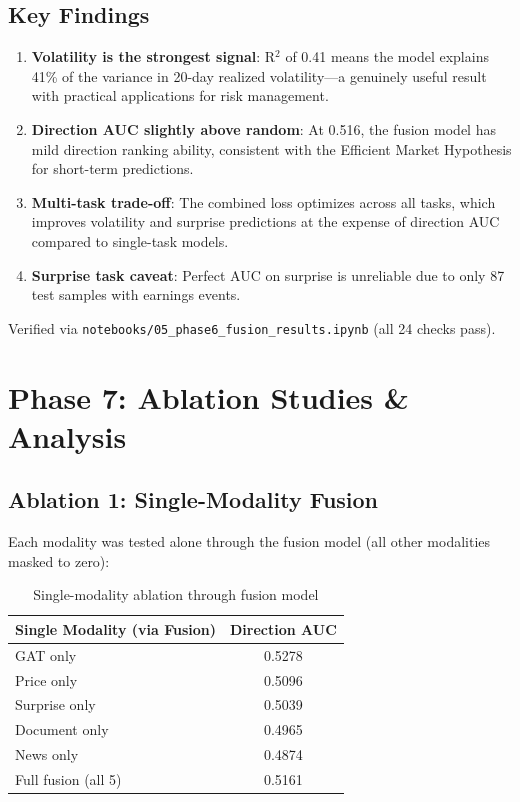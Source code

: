 \documentclass[12pt,a4paper]{article}
\begin{document}
\subsection{Key Findings}

\begin{enumerate}
    \item \textbf{Volatility is the strongest signal}: R$^2$ of 0.41 means the model explains 41\% of the variance in 20-day realized volatility---a genuinely useful result with practical applications for risk management.
    
    \item \textbf{Direction AUC slightly above random}: At 0.516, the fusion model has mild direction ranking ability, consistent with the Efficient Market Hypothesis for short-term predictions.
    
    \item \textbf{Multi-task trade-off}: The combined loss optimizes across all tasks, which improves volatility and surprise predictions at the expense of direction AUC compared to single-task models.
    
    \item \textbf{Surprise task caveat}: Perfect AUC on surprise is unreliable due to only 87 test samples with earnings events.
\end{enumerate}

\noindent Verified via \texttt{notebooks/05\_phase6\_fusion\_results.ipynb} (all 24 checks pass).

\section{Phase 7: Ablation Studies \& Analysis}
\label{sec:phase7}

\subsection{Ablation 1: Single-Modality Fusion}

Each modality was tested alone through the fusion model (all other modalities masked to zero):

\begin{table}[H]
\centering
\begin{tabular}{lc}
\toprule
\textbf{Single Modality (via Fusion)} & \textbf{Direction AUC} \\
\midrule
GAT only & 0.5278 \\
Price only & 0.5096 \\
Surprise only & 0.5039 \\
Document only & 0.4965 \\
News only & 0.4874 \\
\midrule
Full fusion (all 5) & 0.5161 \\
\bottomrule
\end{tabular}
\caption{Single-modality ablation through fusion model}
\label{tab:single_mod}
\end{table}
\end{document}
